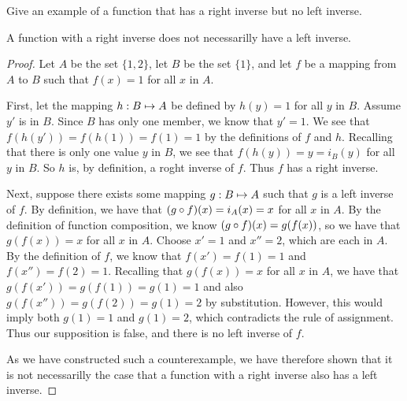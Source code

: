 \documentclass[main.tex]{subfiles}
\begin{document}
\subproblem{}\label{s2p5c}

Give an example of a function that has a right inverse but no left inverse.

\begin{thm}
	A function with a right inverse does not necessarilly have a left
	inverse.
\end{thm}
\begin{proof}
	Let \(A\) be the set \(\{1,2\}\), let \(B\) be the set \(\{1\}\), and
	let \(f\) be a mapping from \(A\) to \(B\) such that \(f(x) = 1\) for
	all \(x\) in \(A\).

	First, let the mapping \({h}: {B} \mapsto{} {A}\) be defined by \(h(y) = 1\)
	for all \(y\) in \(B\). Assume \(y'\) is in \(B\). Since \(B\) has only
	one member, we know that \(y' = 1\). We see that
	\(f(h(y')) = f(h(1)) = f(1) = 1\) by the definitions of \(f\) and \(h\).
	Recalling that there is only one value \(y\) in \(B\), we see that
	\(f(h(y)) = y = i_B(y)\) for all \(y\) in \(B\). So \(h\) is, by
	definition, a roght inverse of \(f\). Thus \(f\) has a right inverse.

	Next, suppose there exists some mapping \({g}: {B} \mapsto{} {A}\) such that
	\(g\) is a left inverse of \(f\). By definition, we have that
	\(({g} \circ{} {f})({x}) = i_A(x) = x\) for all \(x\) in \(A\). By the
	definition of function composition, we know
	\(({g} \circ{} {f})({x}) = g(f(x))\), so we have that \(g(f(x)) = x\)
	for all \(x\) in \(A\). Choose \(x' = 1\) and \(x'' = 2\), which are
	each in \(A\). By the definition of \(f\), we know that
	\(f(x') = f(1) = 1\) and \(f(x'') = f(2) = 1\). Recalling that
	\(g(f(x)) = x\) for all \(x\) in \(A\), we have that
	\(g(f(x')) = g(f(1)) = g(1) = 1\) and also
	\(g(f(x'')) = g(f(2)) = g(1) = 2\) by substitution. However, this would
	imply both \(g(1) = 1\) and \(g(1) = 2\), which contradicts the rule of
	assignment. Thus our supposition is false, and there is no left inverse
	of \(f\).

	As we have constructed such a counterexample, we have therefore shown
	that it is not necessarilly the case that a function with a right
	inverse also has a left inverse.
\end{proof}
\end{document}
